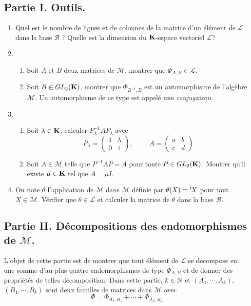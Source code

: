 \subsection*{Partie I. Outils.}
\begin{enumerate}
 \item Quel est le nombre de lignes et de colonnes de la matrice d'un élément de $\mathcal{L}$ dans la base $\mathcal{B}$ ? Quelle est la dimension du $\mathbf{K}$-espace vectoriel $\mathcal{L}$?
\item 
\begin{enumerate}
 \item Soit $A$ et $B$ deux matrices de $\mathcal{M}$, montrer que $\Phi_{A,B}\in \mathcal{L}$.
 \item Soit $B\in GL_2(\mathbf{K})$, montrer que $\Phi_{B^{-1},B}$ est un automorphisme de l'algèbre $\mathcal{M}$. Un automorphisme de ce type est appelé une \emph{conjugaison}.
\end{enumerate}
 \item
\begin{enumerate}
\item Soit $\lambda\in \mathbf{K}$, calculer $P_\lambda^{-1}AP_\lambda$ avec
\begin{displaymath}
 P_\lambda = 
\begin{pmatrix}
 1 & \lambda \\ 0 & 1
\end{pmatrix}
,\hspace{1cm}
A = 
\begin{pmatrix}
 a & b \\ c & d
\end{pmatrix}
\end{displaymath}
\item Soit $A\in \mathcal{M}$ telle que $P^{-1}AP=A$ pour toute $P\in GL_2(\mathbf{K})$. Montrer qu'il existe $\mu\in \mathbf{K}$ tel que $A=\mu I$.
\end{enumerate}
\item On note $\theta$ l'application de $\mathcal{M}$ dans $\mathcal{M}$ définie par $\theta(X) = \mathstrut^t\!X$ pour tout $X\in \mathcal{M}$. Vérifier que $\theta \in \mathcal{L}$ et calculer la matrice de $\theta$ dans la base $\mathcal{B}$.
 
\end{enumerate}

\subsection*{Partie II. Décompositions des endomorphismes de $\mathcal{M}$.}
L'objet de cette partie est de montrer que tout élément de $\mathcal{L}$ se décompose en une somme d'au plus quatre endomorphismes de type $\Phi_{A,B}$ et de donner des propriétés de telles décomposition.\newline
Dans cette partie, $k\in \mathbb{N}$ et $(A_1,\cdots,A_k)$, $(B_1,\cdots,B_k)$ sont deux familles de matrices dans $\mathcal{M}$ avec
\begin{displaymath}
 \Phi= \Phi_{A_1,B_1} + \cdots + \Phi_{A_k,B_k}
\end{displaymath}

